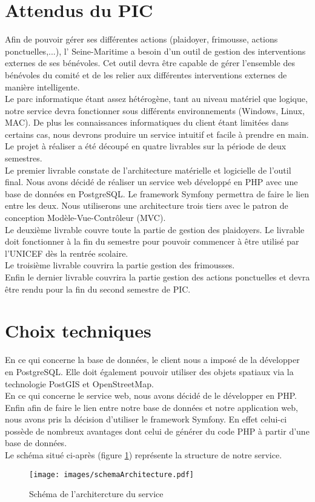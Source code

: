 \documentclass[asi]{picInsa}
\begin{document}
\section{Attendus du PIC}
Afin de pouvoir gérer ses différentes actions (plaidoyer, frimousse, actions ponctuelles,...), l'\nomClient{} Seine-Maritime a besoin d'un outil de gestion des interventions externes de ses bénévoles. Cet outil devra être capable de gérer l'ensemble des bénévoles du comité et de les relier aux différentes interventions externes de manière intelligente.\\
Le parc informatique étant assez hétérogène, tant au niveau matériel que logique, notre service devra fonctionner sous différents environnements (Windows, Linux, MAC). De plus les connaissances informatiques du client étant limitées dans certains cas, nous devrons produire un service intuitif et facile à prendre en main.\\
Le projet à réaliser a été découpé en quatre livrables sur la période de deux semestres.\\
Le premier livrable constate de l'architecture matérielle et logicielle de l'outil final. Nous avons décidé de réaliser un service web développé en PHP avec une base de données en PostgreSQL. Le framework Symfony permettra de faire le lien entre les deux. Nous utiliserons une architecture trois tiers avec le patron de conception Modèle-Vue-Contrôleur (MVC).\\
Le deuxième livrable couvre toute la partie de gestion des plaidoyers. Le livrable doit fonctionner à la fin du semestre pour pouvoir commencer à être utilisé par l'UNICEF dès la rentrée scolaire.\\
Le troisième livrable couvrira la partie gestion des frimousses.\\
Enfin le dernier livrable couvrira la partie gestion des actions ponctuelles et devra être rendu pour la fin du second semestre de PIC.



\section{Choix techniques}
En ce qui concerne la base de données, le client nous a imposé de la développer en PostgreSQL. Elle doit également pouvoir utiliser des objets spatiaux via la technologie PostGIS et OpenStreetMap.\\
En ce qui concerne le service web, nous avons décidé de le développer en PHP.\\
Enfin afin de faire le lien entre notre base de données et notre application web, nous avons pris la décision d'utiliser le framework Symfony. En effet celui-ci possède de nombreux avantages dont celui de générer du code PHP à partir d'une base de données.\\
Le schéma situé ci-après (figure \ref{schéma}) représente la structure de notre service.
\begin{figure}[!h]
	\begin{center}
	\texttt{[image: images/schemaArchitecture.pdf]}
	\label{schéma}
	\caption{Schéma de l'architercture du service}
	\end{center}
\end{figure}
\end{document}
